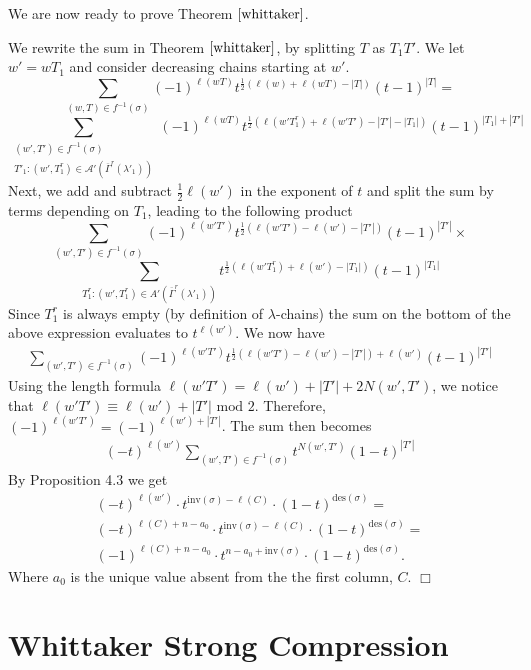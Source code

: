 \documentclass[11pt]{amsart}
\newenvironment{proof1}{{\emph{Proof of Theorem.} }}{\hfill $\Box$ \\}
\begin{document}
{We are now ready to prove Theorem $\ref{whittaker}$.

\begin{proof1}
We rewrite the sum in Theorem $\ref{whittaker}$, by splitting $T$ as $T_{1}T'$. We let $w'=wT_{1}$ and consider decreasing chains starting at $w'$.
\[
\sum_{(w,T)\in f^{-1}(\sigma)}(-1)^{\ell(wT)}t^{\frac{1}{2}(\ell(w)+\ell(wT)-|T|)}(t-1)^{|T|}=
\]
\[
\sum_{\substack{(w',T')\in f^{-1}(\sigma)\\ T'_{1}:(w',T^{r}_{1})\in \mathcal{A}'(\overline{\Gamma}^{r}(\lambda'_{1}))}}(-1)^{\ell(wT)}t^{\frac{1}{2}(\ell(w'T^{r}_{1})+\ell(w'T')-|T'|-|T_{1}|)}(t-1)^{|T_{1}|+|T'|}
\]
Next, we add and subtract $\frac{1}{2}\ell(w')$ in the exponent of $t$ and split the sum by terms depending on $T_{1}$, leading to the following product
\[
\sum_{(w',T')\in f^{-1}(\sigma)}(-1)^{\ell(w'T')}t^{\frac{1}{2}(\ell(w'T')-\ell(w')-|T'|)}(t-1)^{|T'|}\times
\]
\[
\sum_{T^{r}_{1}:(w',T^{r}_{1})\in A'(\overline{\Gamma}^{r}(\lambda'_{1}))}t^{\frac{1}{2}(\ell(w'T^{r}_{1})+\ell(w')-|T_{1}|)}(t-1)^{|T_{1}|}
\]
Since $T^{r}_{1}$ is always empty (by definition of $\lambda$-chains) the sum on the bottom of the above expression evaluates to $t^{\ell(w')}$. We now have 
\begin{align*}
\sum_{(w',T')\in f^{-1}(\sigma)}(-1)^{\ell(w'T')}t^{\frac{1}{2}(\ell(w'T')-\ell(w')-|T'|)+\ell(w')}(t-1)^{|T'|}
\end{align*}
Using the length formula $\ell(w'T')=\ell(w')+|T'|+2N(w',T')$, we notice that $\ell(w'T') \equiv \ell(w')+|T'| \textrm{  mod 2}$. Therefore, $(-1)^{\ell(w'T')}=(-1)^{\ell(w')+|T'|}$. The sum then becomes 
\begin{align*}
(-t)^{\ell(w')}\sum_{(w',T')\in f^{-1}(\sigma)} t^{N(w',T')}(1-t)^{|T'|}
\end{align*}
By Proposition 4.3 we get
\begin{align*}
(-t)^{\ell(w')} \cdot t^{\textrm{inv}(\sigma)-\ell(C)}\cdot(1-t)^{\textrm{des}(\sigma)}=\\
(-t)^{\ell(C)+n-a_{0}}\cdot t^{\textrm{inv}(\sigma)-\ell(C)}\cdot(1-t)^{\textrm{des}(\sigma)}=\\
(-1)^{\ell(C)+n-a_{0}}\cdot t^{n-a_{0}+\textrm{inv}(\sigma)}\cdot(1-t)^{\textrm{des}(\sigma)}.
\end{align*}
Where $a_{0}$ is the unique value absent from the the first column, $C$.
\end{proof1}



\section{Whittaker Strong Compression}
}
\end{document}
